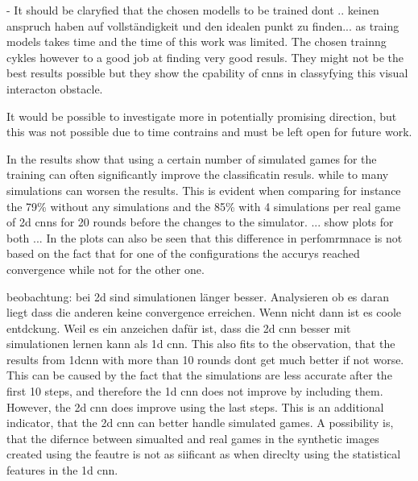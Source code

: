 - It should be claryfied that the chosen modells to be trained dont .. keinen anspruch haben auf vollständigkeit und den idealen punkt zu finden... as traing models takes time and the time of this work was limited. The chosen trainng cykles however to a good job at finding very good resuls. They might not be the best results possible but they show the cpability of cnns in classyfying this visual interacton obstacle. 

 

It would be possible to investigate more in potentially promising direction, but this was not possible due to time contrains and must be left open for future work. 

In the results show that using a certain number of simulated games for the training can often significantly improve the classificatin resuls.  while to many simulations can worsen the results. This is evident when comparing for instance the 79\% without any simulations and the 85\% with 4 simulations per real game of 2d cnns for 20 rounds before the changes to the simulator. 
... show plots for both ...
In the plots can also be seen that this difference in perfomrmnace is not based on the fact that for one of the configurations the accurys reached convergence while not for the other one. 

beobachtung: bei 2d sind simulationen länger besser. Analysieren ob es daran liegt dass die anderen keine convergence erreichen. Wenn nicht dann ist es coole entdckung. Weil es ein anzeichen dafür ist, dass die 2d cnn besser mit simulationen lernen kann als 1d cnn. This also fits to the observation, that the results from 1dcnn with more than 10 rounds dont get much better if not worse. This can be caused by the fact that the simulations are less accurate after the first 10 steps, and therefore the 1d cnn does not improve by including them. However, the 2d cnn does improve using the last steps. This is an additional indicator, that the 2d cnn can better handle simulated games. A possibility is, that the difernce between simualted and real games in the synthetic images created using the feautre is not as siificant as when direclty using the statistical features in the 1d cnn. 

